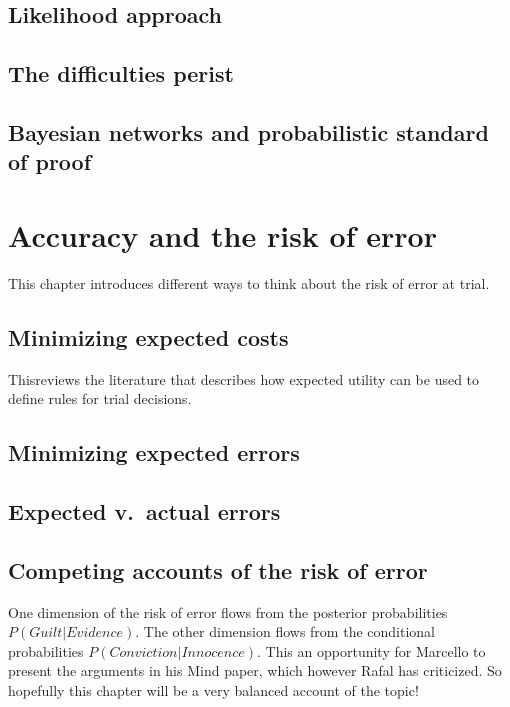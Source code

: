 \documentclass[]{book}
\begin{document}
\section{Likelihood approach}

\section{The difficulties perist}

\section{Bayesian networks and probabilistic standard of proof}

\chapter{Accuracy and the risk of error}

This chapter introduces different
ways to think about the risk
of error at trial.

\section{Minimizing expected costs}

Thisreviews the literature
that describes how
expected utility can be used
to define rules for trial decisions.

\section{Minimizing expected errors}

\section{Expected v.\ actual errors}

\section{Competing accounts 
of the risk of error}

One dimension of the risk of error
flows from the posterior probabilities \(P(Guilt | Evidence)\).
The other dimension flows from the conditional probabilities
\(P(Conviction | Innocence)\).
This an opportunity for Marcello to present the arguments in his Mind paper,
which however Rafal has criticized. So hopefully this chapter
will be a very balanced account of the topic!
\end{document}
